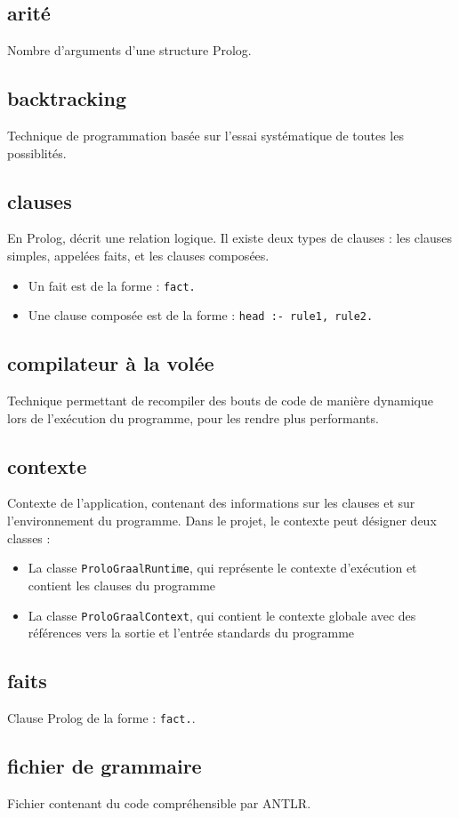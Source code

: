 \documentclass[../report.tex]{subfiles}
\begin{document}
\subsection*{arité}
Nombre d'arguments d'une structure Prolog.
\subsection*{backtracking}
Technique de programmation basée sur l'essai systématique de toutes les possiblités.
\subsection*{clauses}
En Prolog, décrit une relation logique. Il existe deux types de clauses : les clauses simples, appelées faits, et les clauses composées.
\begin{itemize}
    \item Un fait est de la forme : \texttt{fact.}
    \item Une clause composée est de la forme : \texttt{head :- rule1, rule2.}
\end{itemize}
\subsection*{compilateur à la volée}
Technique permettant de recompiler des bouts de code de manière dynamique lors de l'exécution du programme, pour les rendre plus performants.
\subsection*{contexte}
Contexte de l'application, contenant des informations sur les clauses et sur l'environnement du programme. Dans le projet, le contexte peut désigner deux classes :
\begin{itemize}
    \item La classe \texttt{ProloGraalRuntime}, qui représente le contexte d'exécution et contient les clauses du programme
    \item La classe \texttt{ProloGraalContext}, qui contient le contexte globale avec des références vers la sortie et l'entrée standards du programme
\end{itemize}
\subsection*{faits}
Clause Prolog de la forme : \texttt{fact.}.
\subsection*{fichier de grammaire}
Fichier contenant du code compréhensible par ANTLR.
\end{document}
